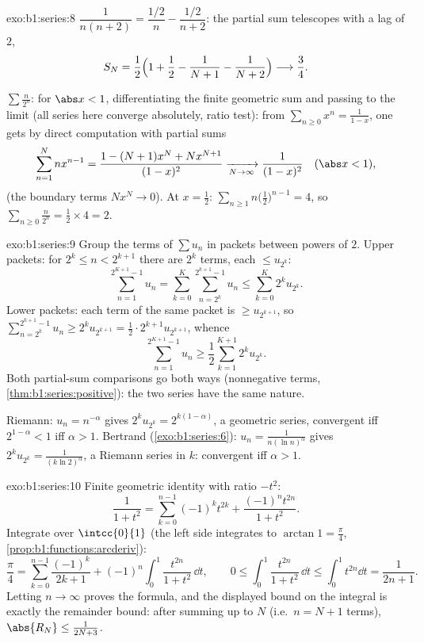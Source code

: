 \begin{solution}{exo:b1:series:8}
$\dfrac{1}{n(n+2)} = \dfrac{1/2}{n} - \dfrac{1/2}{n+2}$: the partial
sum telescopes with a lag of $2$,
\[
S_N = \frac12\Bigl(1 + \frac12 - \frac{1}{N+1} -
\frac{1}{N+2}\Bigr) \longrightarrow \frac34 .
\]

$\sum \frac{n}{2^n}$: for $\abs x < 1$, differentiating the finite
geometric sum and passing to the limit (all series here converge
absolutely, ratio test): from $\sum_{n\geq0} x^n = \frac{1}{1-x}$,
one gets by direct computation with partial sums
\[
\sum_{n=1}^{N} n x^{n-1}
= \frac{1 - (N+1)x^N + N x^{N+1}}{(1 - x)^2}
\xrightarrow[N\to\infty]{} \frac{1}{(1-x)^2}
\quad (\abs x < 1),
\]
(the boundary terms $N x^N \to 0$). At $x = \frac12$:
$\sum_{n\geq1} n\bigl(\frac12\bigr)^{n-1} = 4$, so $\sum_{n\geq0}
\frac{n}{2^n} = \frac12 \times 4 = 2$.
\end{solution}

\begin{solution}{exo:b1:series:9}
Group the terms of $\sum u_n$ in packets between powers of $2$.
Upper packets: for $2^k \leq n < 2^{k+1}$ there are $2^k$ terms,
each $\leq u_{2^k}$:
\[
\sum_{n=1}^{2^{K+1}-1} u_n
= \sum_{k=0}^{K} \sum_{n=2^k}^{2^{k+1}-1} u_n
\leq \sum_{k=0}^{K} 2^k u_{2^k} .
\]
Lower packets: each term of the same packet is $\geq u_{2^{k+1}}$,
so $\sum_{n=2^k}^{2^{k+1}-1} u_n \geq 2^k u_{2^{k+1}} = \frac12
\cdot 2^{k+1} u_{2^{k+1}}$, whence
\[
\sum_{n=1}^{2^{K+1}-1} u_n \geq \frac12 \sum_{k=1}^{K+1} 2^{k}
u_{2^{k}} .
\]
Both partial-sum comparisons go both ways (nonnegative terms,
\cref{thm:b1:series:positive}): the two series have the same nature.

Riemann: $u_n = n^{-\alpha}$ gives $2^k u_{2^k} =
2^{k(1-\alpha)}$, a geometric series, convergent iff $2^{1 - \alpha}
< 1$ iff $\alpha > 1$. Bertrand
(\cref{exo:b1:series:6}): $u_n = \frac{1}{n(\ln n)^\alpha}$ gives
$2^k u_{2^k} = \frac{1}{(k\ln 2)^\alpha}$, a Riemann series in $k$:
convergent iff $\alpha > 1$.
\end{solution}

\begin{solution}{exo:b1:series:10}
Finite geometric identity with ratio $-t^2$:
\[
\frac{1}{1 + t^2} = \sum_{k=0}^{n-1} (-1)^k t^{2k}
+ \frac{(-1)^n t^{2n}}{1 + t^2} .
\]
Integrate over $\intcc{0}{1}$ (the left side integrates to $\arctan
1 = \frac\pi4$, \cref{prop:b1:functions:arcderiv}):
\[
\frac{\pi}{4} = \sum_{k=0}^{n-1} \frac{(-1)^k}{2k+1}
+ (-1)^n \int_0^1 \frac{t^{2n}}{1+t^2}\,\dd t,
\qquad
0 \leq \int_0^1 \frac{t^{2n}}{1+t^2}\,\dd t \leq \int_0^1 t^{2n}\dd
t = \frac{1}{2n+1} .
\]
Letting $n \to \infty$ proves the formula, and the displayed bound
on the integral is exactly the remainder bound: after summing up to
$N$ (i.e.\ $n = N + 1$ terms), $\abs{R_N} \leq \frac{1}{2N + 3}$.
\end{solution}

